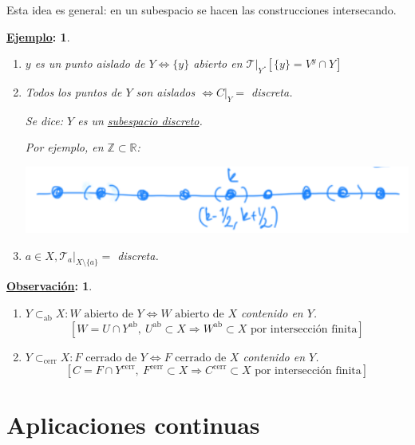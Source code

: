 \documentclass[10pt,a4paper,openright]{book}
\theoremstyle{break}
\newtheorem*{obs}{\underline{Observación}:}
\newtheorem*{ej}{\underline{Ejemplo}:}
\begin{document}
Esta idea es general: en un subespacio se hacen las construcciones intersecando.

\begin{ej}
\begin{enumerate}
    \item $y$ es un punto aislado de $Y \Leftrightarrow \{y\}$ abierto en $\mathcal{T}|_Y. \left[ \{y\} = V^y \cap Y \right]$
    \item Todos los puntos de $Y$ son aislados $\Leftrightarrow C|_Y = $ discreta.

    Se dice: $Y$ es un \underline{subespacio discreto}. 

    Por ejemplo, en $\mathbb{Z} \subset \mathbb{R}$:
    \begin{center}
        \includegraphics[scale=0.3]{images/def_subespacio_discreto} 
    \end{center}

    \item $a \in X, \mathcal{T}_a|_{X \setminus \{a\}} = $ discreta.
\end{enumerate}
\end{ej}

\begin{obs}
\begin{enumerate}
    \item $Y \subset_{\text{ab}} X: W \text{ abierto de } Y \Leftrightarrow W \text{ abierto de } X$ contenido en $Y$.
    \[
    \left[ W = U \cap Y^{\text{ab}},\ U^{\text{ab}} \subset X \Rightarrow W^{\text{ab}} \subset X \text{ por intersección finita} \right] 
    \]
    \item $Y \subset_{\text{cerr}} X: F \text{ cerrado de } Y \Leftrightarrow F \text{ cerrado de } X$ contenido en $Y$.
    \[
    \left[ C = F \cap Y^{\text{cerr}},\ F^{\text{cerr}} \subset X \Rightarrow C^{\text{cerr}} \subset X \text{ por intersección finita} \right] 
    \]
\end{enumerate}
\end{obs}

\chapter{Aplicaciones continuas}%
\label{cha:aplicaciones_continuas}
\end{document}
